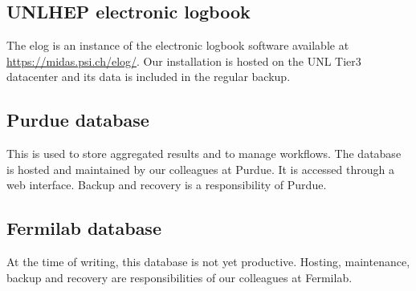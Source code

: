 \documentclass[12pt]{unlsilabsop}
\begin{document}
\subsection{UNLHEP electronic logbook}
The elog is an instance of the electronic logbook software available at \url{https://midas.psi.ch/elog/}. Our installation is hosted on the UNL Tier3 datacenter and its data is included in the regular backup.

\subsection{Purdue database}
This is used to store aggregated results and to manage workflows. The database is hosted and maintained by our colleagues at Purdue. It is accessed through a web interface. Backup and recovery is a responsibility of Purdue.

\subsection{Fermilab database}
At the time of writing, this database is not yet productive. Hosting, maintenance, backup and recovery are responsibilities of our colleagues at Fermilab.
\end{document}
